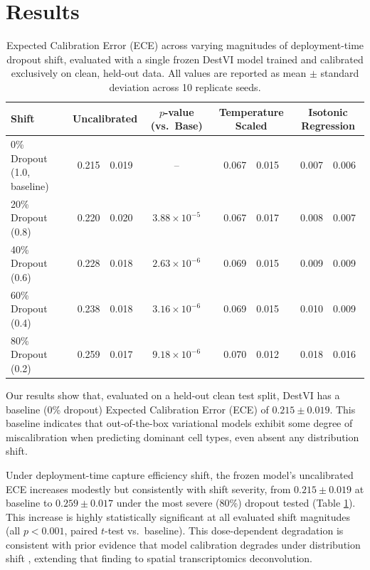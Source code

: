\documentclass[pmlr,twocolumn,10pt]{jmlr} %
\begin{document}
\section{Results}
\begin{table}[t!]
\centering
\footnotesize
\caption{Expected Calibration Error (ECE) across varying magnitudes of deployment-time dropout shift, evaluated with a single frozen DestVI model trained and calibrated exclusively on clean, held-out data. All values are reported as mean $\pm$ standard deviation across 10 replicate seeds.}
\label{tab:results}
\begin{tabular}{l r@{\,$\pm$\,}l c r@{\,$\pm$\,}l r@{\,$\pm$\,}l}
\toprule
Shift & \multicolumn{2}{c}{Uncalibrated} & $p$-value (vs.\ Base) & \multicolumn{2}{c}{Temperature Scaled} & \multicolumn{2}{c}{Isotonic Regression} \\
\midrule
0\% Dropout (1.0, baseline) & 0.215 & 0.019 & -- & 0.067 & 0.015 & 0.007 & 0.006 \\
20\% Dropout (0.8) & 0.220 & 0.020 & $3.88 \times 10^{-5}$ & 0.067 & 0.017 & 0.008 & 0.007 \\
40\% Dropout (0.6) & 0.228 & 0.018 & $2.63 \times 10^{-6}$ & 0.069 & 0.015 & 0.009 & 0.009 \\
60\% Dropout (0.4) & 0.238 & 0.018 & $3.16 \times 10^{-6}$ & 0.069 & 0.015 & 0.010 & 0.009 \\
80\% Dropout (0.2) & 0.259 & 0.017 & $9.18 \times 10^{-6}$ & 0.070 & 0.012 & 0.018 & 0.016 \\
\bottomrule
\end{tabular}
\end{table}

Our results show that, evaluated on a held-out clean test split, DestVI has a baseline (0\% dropout) Expected Calibration Error (ECE) of $0.215 \pm 0.019$. This baseline indicates that out-of-the-box variational models exhibit some degree of miscalibration when predicting dominant cell types, even absent any distribution shift.

Under deployment-time capture efficiency shift, the frozen model's uncalibrated ECE increases modestly but consistently with shift severity, from $0.215 \pm 0.019$ at baseline to $0.259 \pm 0.017$ under the most severe (80\%) dropout tested (Table \ref{tab:results}). This increase is highly statistically significant at all evaluated shift magnitudes (all $p < 0.001$, paired $t$-test vs.\ baseline). This dose-dependent degradation is consistent with prior evidence that model calibration degrades under distribution shift \citep{ovadia2019can}, extending that finding to spatial transcriptomics deconvolution.
\end{document}
